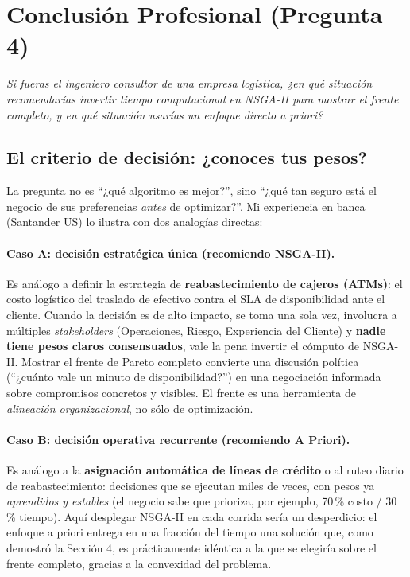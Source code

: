 \section{Conclusión Profesional (Pregunta 4)}

\textit{Si fueras el ingeniero consultor de una empresa logística, ¿en qué
situación recomendarías invertir tiempo computacional en NSGA-II para mostrar
el frente completo, y en qué situación usarías un enfoque directo a priori?}

\subsection{El criterio de decisión: ¿conoces tus pesos?}

La pregunta no es ``¿qué algoritmo es mejor?'', sino ``¿qué tan seguro está el
negocio de sus preferencias \emph{antes} de optimizar?''. Mi experiencia en
banca (Santander US) lo ilustra con dos analogías directas:

\paragraph{Caso A: decisión estratégica única (recomiendo NSGA-II).}
Es análogo a definir la estrategia de \textbf{reabastecimiento de cajeros
(ATMs)}: el costo logístico del traslado de efectivo contra el SLA de
disponibilidad ante el cliente. Cuando la decisión es de alto impacto, se toma
una sola vez, involucra a múltiples \emph{stakeholders} (Operaciones, Riesgo,
Experiencia del Cliente) y \textbf{nadie tiene pesos claros consensuados},
vale la pena invertir el cómputo de NSGA-II. Mostrar el frente de Pareto
completo convierte una discusión política (``¿cuánto vale un minuto de
disponibilidad?'') en una negociación informada sobre compromisos concretos y
visibles. El frente es una herramienta de \emph{alineación organizacional},
no sólo de optimización.

\paragraph{Caso B: decisión operativa recurrente (recomiendo A Priori).}
Es análogo a la \textbf{asignación automática de líneas de crédito} o al
ruteo diario de reabastecimiento: decisiones que se ejecutan miles de veces,
con pesos ya \emph{aprendidos y estables} (el negocio sabe que prioriza, por
ejemplo, 70\,\% costo / 30\,\% tiempo). Aquí desplegar NSGA-II en cada corrida
sería un desperdicio: el enfoque a priori entrega en una fracción del tiempo
una solución que, como demostró la Sección 4, es prácticamente idéntica a
la que se elegiría sobre el frente completo, gracias a la convexidad del
problema.

